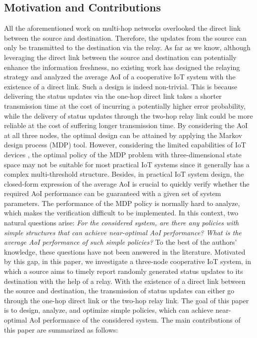 \documentclass{IEEEtran}
\begin{document}
%

 

\subsection{Motivation and Contributions}
All the aforementioned work on multi-hop networks overlooked the direct link between the source and destination. Therefore, the updates from the source can only be transmitted to the destination via the relay. As far as we know, although leveraging the direct link between the source and destination can potentially enhance the information freshness, no existing work has designed the relaying strategy and analyzed the average AoI of a cooperative IoT  system with the existence of a direct link. Such a design is indeed non-trivial. This is because delivering the status updates via the one-hop direct link takes a shorter transmission time at the cost of incurring a potentially higher error probability, while the delivery of status updates through the two-hop relay link could be more reliable at the cost of suffering longer transmission time. By considering the AoI at all three nodes, the optimal design can be attained by applying the Markov design process (MDP) tool. However, considering the limited capabilities of IoT devices \cite{b40}, the 
optimal policy of the MDP problem with three-dimensional state space may not be suitable for most practical IoT systems since it generally has a complex multi-threshold structure. Besides, in practical IoT system design, the closed-form expression of the average AoI is crucial to quickly verify whether the required AoI performance can be guaranteed with a given set of system parameters. The performance of the MDP policy is normally hard to analyze, which makes the verification difficult to be implemented. In this context, two natural questions arise: \textit{For the considered system, are there any policies with simple structures that can achieve near-optimal AoI performance? What is the average AoI performance of such simple policies?} To the best of the authors' knowledge, these questions have not been answered in the literature. Motivated by this gap, in this paper, we investigate a three-node cooperative IoT system, in which a source aims to timely report randomly generated status updates to its destination with the help of a relay. With the existence of a direct link between the source and destination, the transmission of status updates can either go through the one-hop direct link or the two-hop relay link. The goal of this paper is to design, analyze, and optimize simple policies, which can achieve near-optimal AoI performance of the considered system. The main contributions of this paper are summarized as follows:
\end{document}
